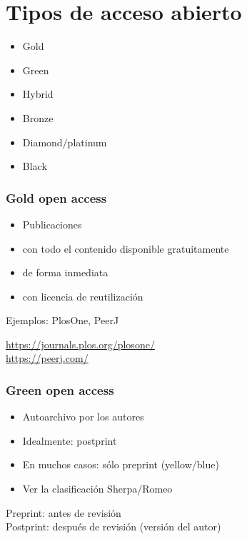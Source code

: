 \documentclass[17pt,aspectratio=169]{beamer}
\begin{document}
\section{Tipos de acceso abierto}

\begin{frame}

\begin{itemize}
\item Gold
\item Green
\item Hybrid
\item Bronze
\item Diamond/platinum
\item Black
\end{itemize}

\end{frame}

\begin{frame}
\frametitle{Gold open access}

\begin{itemize}
\item Publicaciones
\item con todo el contenido disponible gratuitamente
\item de forma inmediata
\item con licencia de reutilización
\end{itemize}

Ejemplos: PlosOne, PeerJ

\begin{flushright}
  \url{https://journals.plos.org/plosone/} \\
  \url{https://peerj.com/} \\
\end{flushright}
\end{frame}

\begin{frame}
\frametitle{Green open access}

\begin{itemize}
\item Autoarchivo por los autores
\item Idealmente: postprint
\item En muchos casos: sólo preprint (yellow/blue)
\item Ver la clasificación Sherpa/Romeo
\end{itemize}

\vspace{.5cm}

Preprint: antes de revisión \\
Postprint: después de revisión (versión del autor) \\
\end{frame}
\end{document}
